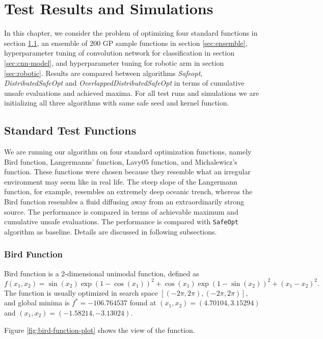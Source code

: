 \chapter{Test Results and Simulations}
\label{ch:results}

In this chapter, we consider the problem of optimizing four standard functions in section \ref{sec:std-test-functions}, an ensemble of 200 GP sample functions in section \ref{sec:ensemble}, hyperparameter tuning of convolution network for classification in section \ref{sec:cnn-model}, and hyperparameter tuning for robotic arm in section \ref{sec:robotic}. Results are compared between algorithms \textit{Safeopt}, \textit{DistributedSafeOpt} and \textit{OverlappedDistributedSafeOpt} in terms of cumulative unsafe evaluations and achieved maxima. For all test runs and simulations we are initializing all three algorithms with same safe seed and kernel function.  

\section{Standard Test Functions}\label{sec:std-test-functions}
We are running our algorithm on four standard optimization functions, namely Bird function, Langermanns' function, Lavy05 function, and Michalewicz's function. These functions were chosen because they resemble what an irregular environment may seem like in real life. The steep slope of the Langermann function, for example, resembles an extremely deep oceanic trench, whereas the Bird function resembles a fluid diffusing away from an extraordinarily strong source. The performance is compared in terms of achievable maximum and cumulative unsafe evaluations. 
The performance is compared with \texttt{SafeOpt} algorithm as baseline. Details are discussed in following subsections.

\subsection{Bird Function}
Bird function is a 2-dimensional unimodal function, defined as
$$ f(x_1, x_2) = \sin(x_2) \exp (1-\cos(x_1))^2 + \cos(x_1)\exp(1-\sin(x_2))^2 + (x_1 - x_2)^2. $$
The function is usually optimized in search space $ [ (-2\pi, 2\pi), (-2\pi, 2\pi) ] $, and global minima is $f^*=-106.764537$ found at $(x_1, x_2)=(4.70104, 3.15294)$ and $(x_1, x_2)=(-1.58214, -3.13024)$.

Figure \ref{fig:bird-function-plot} shows the view of the function.

